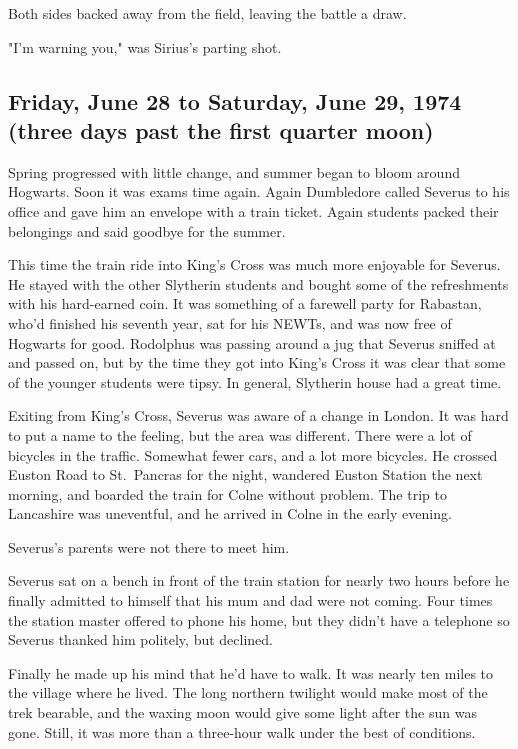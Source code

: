 Both sides backed away from the field, leaving the battle a draw.

"I'm warning you," was Sirius's parting shot.

\subsection{Friday, June 28 to Saturday, June 29, 1974 \\ (three days past the first quarter moon)}

Spring progressed with little change, and summer began to bloom around Hogwarts. Soon it was exams time again. Again Dumbledore called Severus to his office and gave him an envelope with a train ticket. Again students packed their belongings and said goodbye for the summer.

This time the train ride into King's Cross was much more enjoyable for Severus. He stayed with the other Slytherin students and bought some of the refreshments with his hard-earned coin. It was something of a farewell party for Rabastan, who'd finished his seventh year, sat for his NEWTs, and was now free of Hogwarts for good. Rodolphus was passing around a jug that Severus sniffed at and passed on, but by the time they got into King's Cross it was clear that some of the younger students were tipsy. In general, Slytherin house had a great time.

Exiting from King's Cross, Severus was aware of a change in London. It was hard to put a name to the feeling, but the area was different. There were a lot of bicycles in the traffic. Somewhat fewer cars, and a lot more bicycles. He crossed Euston Road to St.~Pancras for the night, wandered Euston Station the next morning, and boarded the train for Colne without problem. The trip to Lancashire was uneventful, and he arrived in Colne in the early evening.

Severus's parents were not there to meet him.

Severus sat on a bench in front of the train station for nearly two hours before he finally admitted to himself that his mum and dad were not coming. Four times the station master offered to phone his home, but they didn't have a telephone so Severus thanked him politely, but declined.

Finally he made up his mind that he'd have to walk. It was nearly ten miles to the village where he lived. The long northern twilight would make most of the trek bearable, and the waxing moon would give some light after the sun was gone. Still, it was more than a three-hour walk under the best of conditions.

